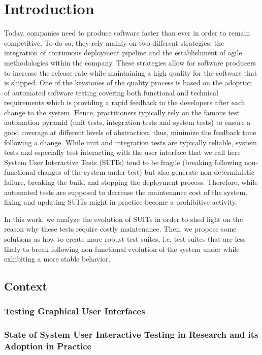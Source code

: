 \chapter{Introduction}

Today, companies need to produce software faster than ever in order to remain competitive. To do so, they rely mainly on two different strategies: the integration of continuous deployment pipeline and the establishment of agile methodologies within the company. These strategies allow for software producers to increase the release rate while maintaining a high quality for the software that is shipped.
One of the keystones of the quality process is based on the adoption of automated software testing covering both functional and technical requirements which is providing a rapid feedback to the developers after each change to the system. Hence, practitioners typically rely on the famous test automation pyramid (unit tests, integration tests and system tests) to ensure a good coverage at different levels of abstraction, thus, minimize the feedback time following a change.
While unit and integration tests are typically reliable, system tests and especially test interacting with the user interface that we call here System User Interactive Tests (SUITs) tend to be fragile (breaking following non-functional changes of the system under test) but also generate non deterministic failure, breaking the build and stopping the deployment process. Therefore, while automated tests are supposed to decrease the maintenance cost of the system, fixing and updating SUITs might in practice become a prohibitive activity.

In this work, we analyze the evolution of SUITs in order to shed light on the reason why these tests require costly maintenance. Then, we propose some solutions as how to create more robust test suites, i.e, test suites that are less likely to break following non-functional evolution of the system under while exhibiting a more stable behavior.


\section{Context}
\subsection{Testing Graphical User Interfaces}
\subsection{State of System User Interactive Testing in Research and its Adoption in Practice}
